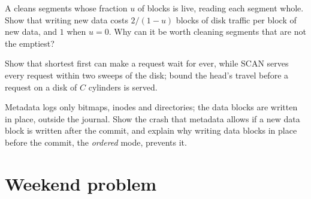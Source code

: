 \begin{exercise}[$\star\star\star$]\label{exo:b3:file-systems:10}
A  cleans segments whose fraction $u$ of blocks is live, reading each segment whole. Show that writing new data costs $2/(1 - u)$ blocks of disk traffic per block of new data, and $1$ when $u = 0$. Why can it be worth cleaning segments that are not the emptiest?
\end{exercise}

\begin{exercise}[$\star\star\star$]\label{exo:b3:file-systems:11}
Show that shortest  first can make a request wait for ever, while SCAN serves every request within two sweeps of the disk; bound the head's travel before a request on a disk of $C$ cylinders is served.
\end{exercise}

\begin{exercise}[$\star\star\star$]\label{exo:b3:file-systems:12}
Metadata  logs only bitmaps, inodes and directories; the data blocks are written in place, outside the journal. Show the crash that metadata  allows if a new data block is written after the commit, and explain why writing data blocks in place before the commit, the \emph{ordered} mode, prevents it.
\end{exercise}

\section{Weekend problem}\label{sec:b3:file-systems:problem}

